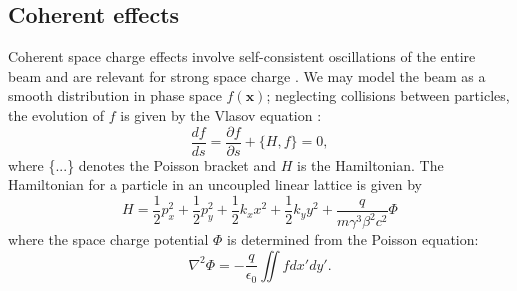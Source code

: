 \subsection{Coherent effects}

Coherent space charge effects involve self-consistent oscillations of the entire beam and are relevant for strong space charge \cite{book:Reiser, Wangler2008}. We may model the beam as a smooth distribution in phase space $f(\mathbf{x})$; neglecting collisions between particles, the evolution of $f$ is given by the Vlasov equation \cite{Vlasov1961}:
%
\begin{equation} \label{eq:Vlasov}
    \frac{df}{ds} = \frac{\partial{f}}{\partial{s}} + \{H, f\} = 0,
\end{equation}
%
where \{...\} denotes the Poisson bracket and $H$ is the Hamiltonian. The Hamiltonian for a particle in an uncoupled linear lattice is given by
%
\begin{equation}
    H = \frac{1}{2}p_x^2 + \frac{1}{2}p_y^2 + \frac{1}{2}k_{x}x^2 + \frac{1}{2}k_{y}y^2 + \frac{q}{m\gamma^3\beta^2c^2}\Phi
\end{equation}
%
where the space charge potential $\Phi$ is determined from the Poisson equation:
%
\begin{equation} \label{eq:Poisson}
    \nabla^2 \Phi = -\frac{q}{\epsilon_0}\iint{f}dx'dy'.
\end{equation}
%

